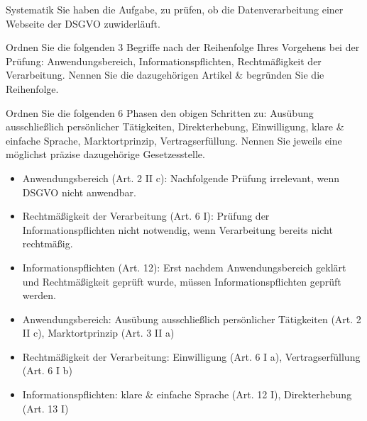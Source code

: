 \documentclass{article}
\begin{document}
\begin{eexercises}{Systematik}{
    Sie haben die Aufgabe, zu prüfen, ob die Datenverarbeitung einer Webseite der DSGVO zuwiderläuft.
  }
  \item Ordnen Sie die folgenden 3 Begriffe nach der Reihenfolge Ihres Vorgehens bei der Prüfung: Anwendungsbereich, Informationspflichten, Rechtmäßigkeit der Verarbeitung. Nennen Sie die dazugehörigen Artikel \& begründen Sie die Reihenfolge.
  \item Ordnen Sie die folgenden 6 Phasen den obigen Schritten zu: Ausübung ausschließlich persönlicher Tätigkeiten, Direkterhebung, Einwilligung, klare \& einfache Sprache, Marktortprinzip, Vertragserfüllung. Nennen Sie jeweils eine möglichst präzise dazugehörige Gesetzesstelle.
\end{eexercises}

\begin{solutions}
  \item
  \begin{itemize}
    \item Anwendungsbereich (Art. 2 II c): Nachfolgende Prüfung irrelevant, wenn DSGVO nicht anwendbar.
    \item Rechtmäßigkeit der Verarbeitung (Art. 6 I): Prüfung der Informationspflichten nicht notwendig, wenn Verarbeitung bereits nicht rechtmäßig.
    \item Informationspflichten (Art. 12): Erst nachdem Anwendungsbereich geklärt und Rechtmäßigkeit geprüft wurde, müssen Informationspflichten geprüft werden.
  \end{itemize}
  \item
  \begin{itemize}
    \item Anwendungsbereich: Ausübung ausschließlich persönlicher Tätigkeiten (Art. 2 II c), Marktortprinzip (Art. 3 II a)
    \item Rechtmäßigkeit der Verarbeitung: Einwilligung (Art. 6 I a), Vertragserfüllung (Art. 6 I b)
    \item Informationspflichten: klare \& einfache Sprache (Art. 12 I), Direkterhebung (Art. 13 I)
  \end{itemize}
\end{solutions}
\end{document}
